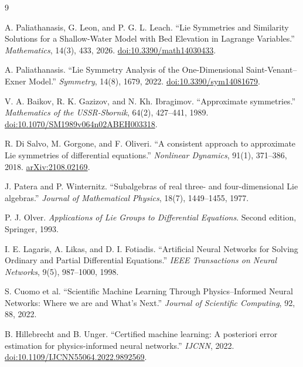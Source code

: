 \documentclass[12pt,a4paper]{article}
\begin{document}
\begin{thebibliography}{9}
\raggedright
\setlength{\itemsep}{3pt}
\setlength{\parskip}{0pt}
A. Paliathanasis, G. Leon, and P. G. L. Leach.
``Lie Symmetries and Similarity Solutions for a Shallow-Water Model with Bed Elevation in Lagrange Variables.''
\emph{Mathematics}, 14(3), 433, 2026.
\href{https://doi.org/10.3390/math14030433}{doi:10.3390/math14030433}.

A. Paliathanasis.
``Lie Symmetry Analysis of the One-Dimensional Saint-Venant--Exner Model.''
\emph{Symmetry}, 14(8), 1679, 2022.
\href{https://doi.org/10.3390/sym14081679}{doi:10.3390/sym14081679}.

V. A. Baikov, R. K. Gazizov, and N. Kh. Ibragimov.
``Approximate symmetries.''
\emph{Mathematics of the USSR-Sbornik}, 64(2), 427--441, 1989.
\href{https://doi.org/10.1070/SM1989v064n02ABEH003318}{doi:10.1070/SM1989v064n02ABEH003318}.

R. Di Salvo, M. Gorgone, and F. Oliveri.
``A consistent approach to approximate Lie symmetries of differential equations.''
\emph{Nonlinear Dynamics}, 91(1), 371--386, 2018.
\href{https://arxiv.org/abs/2108.02169}{arXiv:2108.02169}.

J. Patera and P. Winternitz.
``Subalgebras of real three- and four-dimensional Lie algebras.''
\emph{Journal of Mathematical Physics}, 18(7), 1449--1455, 1977.

P. J. Olver. \emph{Applications of Lie Groups to Differential Equations}.
Second edition, Springer, 1993.

I. E. Lagaris, A. Likas, and D. I. Fotiadis.
``Artificial Neural Networks for Solving Ordinary and Partial Differential Equations.''
\emph{IEEE Transactions on Neural Networks}, 9(5), 987--1000, 1998.

S. Cuomo et al.
``Scientific Machine Learning Through Physics--Informed Neural Networks: Where we are and What's Next.''
\emph{Journal of Scientific Computing}, 92, 88, 2022.

B. Hillebrecht and B. Unger.
``Certified machine learning: A posteriori error estimation for physics-informed neural networks.''
\emph{IJCNN}, 2022.
\href{https://doi.org/10.1109/IJCNN55064.2022.9892569}{doi:10.1109/IJCNN55064.2022.9892569}.
\end{thebibliography}
\end{document}
